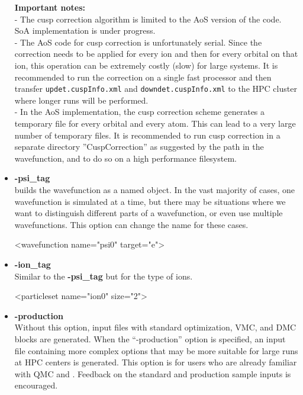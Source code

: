 \begin{itemize}
\textbf{Important notes:}\\
- The cusp correction algorithm is limited to the AoS version of the code. SoA implementation is under progress. \\
- The AoS code for cusp correction is unfortunately serial. Since the correction needs to be applied for every ion and then for every orbital on that ion, this operation can be extremely costly (slow) for large systems. It is recommended to run the correction on a single fast processor and then transfer \texttt{updet.cuspInfo.xml} and \texttt{downdet.cuspInfo.xml} to the HPC cluster where longer runs will be performed. \\
- In the AoS implementation, the cusp correction scheme generates a temporary file for every orbital and every atom. This can lead to a very large number of temporary files.  It is recommended to run cusp correction in a separate directory ''CuspCorrection'' as suggested by the path in the wavefunction, and to do so on a high performance filesystem. \\

\item \textbf{-psi\_tag}\\
\qmcpack builds the wavefunction as a named object. In the vast majority of cases, one wavefunction is simulated at a time, but there may be situations where we want to distinguish different parts of a wavefunction, or even use multiple wavefunctions. This option can change the name for these cases. 

\begin{shade}
   <wavefunction name="psi0" target="e">
\end{shade}

\item \textbf{-ion\_tag} \\
Similar to the \textbf{-psi\_tag} but for the type of ions. \\
\begin{shade}
  <particleset name="ion0" size="2">
\end{shade}


\item \textbf{-production}\\

Without this option, input files with standard optimization, VMC, and
DMC blocks are generated. When the ``-production'' option is
specified, an input file containing more complex options that may be
more suitable for large runs at HPC centers is generated. This option
is for users who are already familiar with QMC and \qmcpack. Feedback
on the standard and production sample inputs is encouraged.


\end{itemize}


